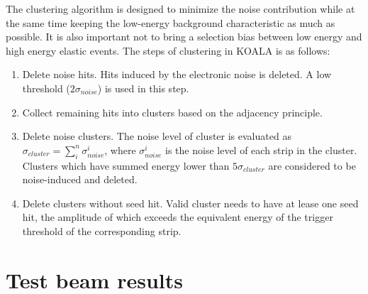 \documentclass[number,5p]{elsarticle}
\begin{document}
The clustering algorithm is designed to minimize the noise contribution while
at the same time keeping the low-energy background characteristic as much as possible.
It is also important not to bring a selection bias between low energy and high energy elastic events.
The steps of clustering in KOALA is as follows:
\begin{enumerate}
\item Delete noise hits. Hits induced by the electronic noise is deleted. A low
  threshold ($2\sigma_{noise}$) is used in this step.
\item Collect remaining hits into clusters based on the adjacency principle.
\item Delete noise clusters. The noise level of cluster is evaluated as
  $\sigma_{cluster} = \sum_i^n{\sigma_{noise}^i}$, where $\sigma_{noise}^i$ is
  the noise level of each strip in the cluster. Clusters which have summed
  energy lower than $5\sigma_{cluster}$ are considered to be noise-induced and deleted.
\item Delete clusters without seed hit. Valid cluster needs to have at lease one seed hit, the
  amplitude of which exceeds the equivalent energy of the trigger threshold of
  the corresponding strip.
\end{enumerate}

\section{Test beam results}
\label{sec:result}
\end{document}

